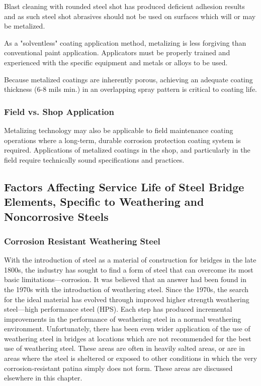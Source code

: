 Blast cleaning with rounded steel shot has produced deficient adhesion results and as such steel shot abrasives
should not be used on surfaces which will or may be metalized.

As a "solventless" coating application method, metalizing is less forgiving than conventional paint application.
Applicators must be properly trained and experienced with the specific equipment and metals or alloys to be used.

Because metalized coatings are inherently porous, achieving an adequate coating thickness (6-8 mils min.) in an
overlapping spray pattern is critical to coating life.

\subsubsection{Field vs. Shop Application}
Metalizing technology may also be applicable to field maintenance coating operations where a long-term,
durable corrosion protection coating system is required. Applications of metalized coatings in the shop, and
particularly in the field require technically sound specifications and practices.

\subsection{Factors Affecting Service Life of Steel Bridge Elements, Specific to Weathering and Noncorrosive Steels}

\subsubsection{Corrosion Resistant Weathering Steel}
With the introduction of steel as a material of construction for bridges in the late 1800s, the industry has sought
to find a form of steel that can overcome its most basic limitations—corrosion. It was believed that an answer had
been found in the 1970s with the introduction of weathering steel. Since the 1970s, the search for the ideal material
has evolved through improved higher strength weathering steel—high performance steel (HPS). Each step has
produced incremental improvements in the performance of weathering steel in a normal weathering environment.
Unfortunately, there has been even wider application of the use of weathering steel in bridges at locations which are
not recommended for the best use of weathering steel. These areas are often in heavily salted areas, or are in areas
where the steel is sheltered or exposed to other conditions in which the very corrosion-resistant patina simply does
not form. These areas are discussed elsewhere in this chapter.


